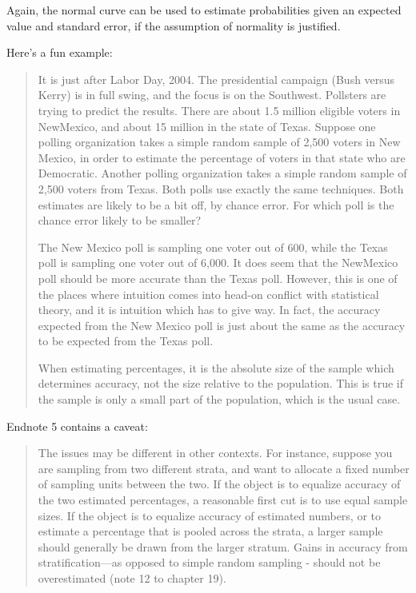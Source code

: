 \documentclass[
]{book}
\begin{document}
Again, the normal curve can be used to estimate probabilities given an expected value and standard error, if the assumption of normality is justified.

Here's a fun example:

\begin{quote}
It is just after Labor Day, 2004. The presidential campaign (Bush versus Kerry) is in full swing, and the focus is on the Southwest. Pollsters are trying to predict the results. There are about 1.5 million eligible voters in NewMexico, and about 15 million in the state of Texas. Suppose one polling organization takes a simple random sample of 2,500 voters in New Mexico, in order to estimate the percentage of voters in that state who are Democratic. Another polling organization takes a simple random sample of 2,500 voters from Texas. Both polls use exactly the same techniques. Both estimates are likely to be a bit off, by chance error. For which poll is the chance error likely to be smaller?

The New Mexico poll is sampling one voter out of 600, while the Texas poll is sampling one voter out of 6,000. It does seem that the NewMexico poll should be more accurate than the Texas poll. However, this is one of the places where intuition comes into head-on conflict with statistical theory, and it is intuition which has to give way. In fact, the accuracy expected from the New Mexico poll is just about the same as the accuracy to be expected from the Texas poll.

When estimating percentages, it is the absolute size of the sample which determines accuracy, not the size relative to the population. This is true if the sample is only a small part of the population,
which is the usual case.
\end{quote}

Endnote 5 contains a caveat:

\begin{quote}
The issues may be different in other contexts. For instance, suppose you are sampling from two different strata, and want to allocate a fixed number of sampling units between the two. If the object is to equalize accuracy of the two estimated percentages, a reasonable first cut is to use equal sample sizes. If the object is to equalize accuracy of estimated numbers, or to estimate a percentage that is pooled across the strata, a larger sample should generally be drawn from the larger stratum. Gains in accuracy from stratification---as opposed to simple random sampling - should not be overestimated (note 12 to chapter 19).
\end{quote}
\end{document}
